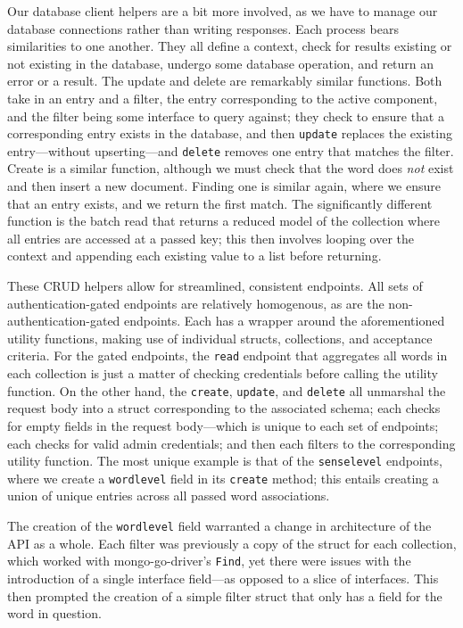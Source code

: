 \documentclass[11pt, twoside, reqno]{book}
\begin{document}
Our database client helpers are a bit more involved, as we have to manage our database connections rather than writing responses. Each process bears similarities to one another. They all define a context, check for results existing or not existing in the database, undergo some database operation, and return an error or a result. The update and delete are remarkably similar functions. Both take in an entry and a filter, the entry corresponding to the active component, and the filter being some interface to query against; they check to ensure that a corresponding entry exists in the database, and then \texttt{update} replaces the existing entry—without upserting—and \texttt{delete} removes one entry that matches the filter. Create is a similar function, although we must check that the word does \textit{not} exist and then insert a new document. Finding one is similar again, where we ensure that an entry exists, and we return the first match. The significantly different function is the batch read that returns a reduced model of the collection where all entries are accessed at a passed key; this then involves looping over the context and appending each existing value to a list before returning.

These CRUD helpers allow for streamlined, consistent endpoints. All sets of authentication-gated endpoints are relatively homogenous, as are the non-authentication-gated endpoints. Each has a wrapper around the aforementioned utility functions, making use of individual structs, collections, and acceptance criteria. For the gated endpoints, the \texttt{read} endpoint that aggregates all words in each collection is just a matter of checking credentials before calling the utility function. On the other hand, the \texttt{create}, \texttt{update}, and \texttt{delete} all unmarshal the request body into a struct corresponding to the associated schema; each checks for empty fields in the request body—which is unique to each set of endpoints; each checks for valid admin credentials; and then each filters to the corresponding utility function. The most unique example is that of the \texttt{senselevel} endpoints, where we create a \texttt{wordlevel} field in its \texttt{create} method; this entails creating a union of unique entries across all passed word associations.

\begin{remark}
The creation of the \texttt{wordlevel} field warranted a change in architecture of the API as a whole. Each filter was previously a copy of the struct for each collection, which worked with mongo-go-driver's \texttt{Find}, yet there were issues with the introduction of a single interface field—as opposed to a slice of interfaces. This then prompted the creation of a simple filter struct that only has a field for the word in question.
\end{remark}
\end{document}
